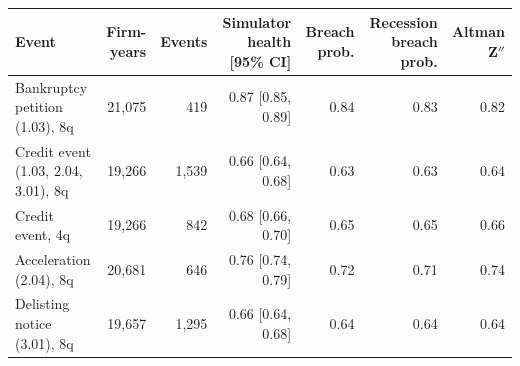 \begin{tabular}{lrrrrrr}
\toprule
Event & Firm-years & Events & Simulator health [95\% CI] & Breach prob. & Recession breach prob. & Altman Z$''$ \\
\midrule
Bankruptcy petition (1.03), 8q & 21{,}075 & 419 & 0.87 [0.85, 0.89] & 0.84 & 0.83 & 0.82 \\
Credit event (1.03, 2.04, 3.01), 8q & 19{,}266 & 1{,}539 & 0.66 [0.64, 0.68] & 0.63 & 0.63 & 0.64 \\
Credit event, 4q & 19{,}266 & 842 & 0.68 [0.66, 0.70] & 0.65 & 0.65 & 0.66 \\
Acceleration (2.04), 8q & 20{,}681 & 646 & 0.76 [0.74, 0.79] & 0.72 & 0.71 & 0.74 \\
Delisting notice (3.01), 8q & 19{,}657 & 1{,}295 & 0.66 [0.64, 0.68] & 0.64 & 0.64 & 0.64 \\
\bottomrule
\end{tabular}
